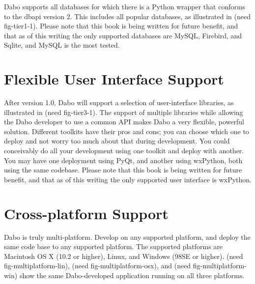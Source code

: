 Dabo supports all databases for which there is a Python wrapper that conforms to 
the dbapi version 2. This includes all popular databases, as illustrated in (need 
fig-tier1-1). Please note that this book is being written for future benefit, and that 
as of this writing the only supported databases are MySQL, Firebird, and Sqlite, and 
MySQL is the most tested.

\section{Flexible User Interface Support}

After version 1.0, Dabo will support a selection of user-interface libraries, as 
illustrated in (need fig-tier3-1). The support of multiple libraries while allowing the 
Dabo developer to use a common API makes Dabo a very flexible, powerful solution. 
Different toolkits have their pros and cons; you can choose which one to deploy 
and not worry too much about that during development. You could conceivably do 
all your development using one toolkit and deploy with another. You may have one 
deployment using PyQt, and another using wxPython, both using the same codebase. 
Please note that this book is being written for future benefit, and that as of this 
writing the only supported user interface is wxPython.

\section{Cross-platform Support}

Dabo is truly multi-platform. Develop on any supported platform, and deploy the 
same code base to any supported platform. The supported platforms are Macintosh 
OS X (10.2 or higher), Linux, and Windows (98SE or higher). (need 
fig-multiplatform-lin), (need fig-multiplatform-osx), and (need fig-multiplatform-win) 
show the same Dabo-developed application running on all three platforms.
